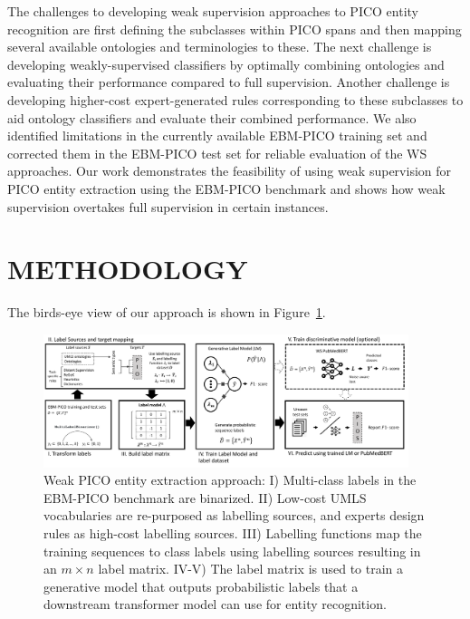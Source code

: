 \documentclass[10.7pt,]{article}
\begin{document}
The challenges to developing weak supervision approaches to PICO entity recognition are first defining the subclasses within PICO spans and then mapping several available ontologies and terminologies to these.
The next challenge is developing weakly-supervised classifiers by optimally combining ontologies and evaluating their performance compared to full supervision.
Another challenge is developing higher-cost expert-generated rules corresponding to these subclasses to aid ontology classifiers and evaluate their combined performance.
We also identified limitations in the currently available EBM-PICO training set and corrected them in the EBM-PICO test set for reliable evaluation of the WS approaches.
Our work demonstrates the feasibility of using weak supervision for PICO entity extraction using the EBM-PICO benchmark and shows how weak supervision overtakes full supervision in certain instances.
%
%
%
\section{METHODOLOGY}\label{methods}
%
The birds-eye view of our approach is shown in Figure~\ref{fig:approach}.
%
\begin{figure}[ht]
\centering
\includegraphics[width=0.95\textwidth]{figures/approach.pdf}
\caption{Weak PICO entity extraction approach: I) Multi-class labels in the EBM-PICO benchmark are binarized. II) Low-cost UMLS vocabularies are re-purposed as labelling sources, and experts design rules as high-cost labelling sources. III) Labelling functions map the training sequences to class labels using labelling sources resulting in an $m \times n$ label matrix. IV-V) The label matrix is used to train a generative model that outputs probabilistic labels that a downstream transformer model can use for entity recognition.}
\label{fig:approach}
\end{figure}
%
\end{document}

